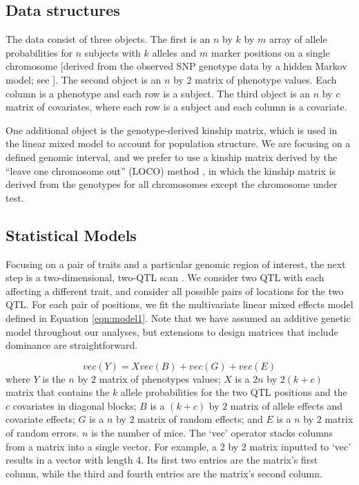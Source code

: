 \documentclass[oneside]{book}
\begin{document}
\subsection{Data structures}

The data consist of three objects. The first is an $n$ by $k$ by $m$
array of allele probabilities for $n$ subjects with $k$ alleles and
$m$ marker positions on a single chromosome [derived from the observed
SNP genotype data by a hidden Markov model; see
\citet{broman2019rqtl2}]. The second object is an $n$ by 2 matrix of
phenotype values. Each column is a phenotype and each row is a
subject. The third object is an $n$ by $c$ matrix of covariates, where
each row is a subject and each column is a covariate.

One additional object is the genotype-derived kinship matrix, which is
used in the linear mixed model to account for population structure. We
are focusing on a defined genomic interval, and we prefer to use a
kinship matrix derived by the ``leave one chromosome out'' (LOCO)
method \citep{yang2014advantages}, in which the kinship matrix is
derived from the genotypes for all chromosomes except the chromosome
under test.




\subsection{Statistical Models}

Focusing on a pair of traits and a particular genomic region of
interest, the next step is a two-dimensional, two-QTL
scan \citep{jiang1995multiple}. We consider two QTL with each
affecting a different trait, and consider all possible pairs of
locations for the two QTL. For each pair of positions, we fit
the multivariate linear mixed effects model defined in Equation
\ref{eqn:model1}. Note that we have
assumed an additive genetic model throughout our analyses, but
extensions to design matrices that include dominance are
straightforward.


\begin{equation}
vec(Y) = X vec(B) + vec(G) + vec(E)
\label{eqn:model1}
\end{equation}
where $Y$ is the $n$ by $2$ matrix of phenotypes values;
$X$ is a $2n$ by $2(k + c)$
matrix that contains the $k$ allele probabilities for the two QTL
positions and the $c$
covariates in diagonal blocks; $B$ is a $(k + c)$ by $2$ matrix of
allele effects and covariate effects; $G$ is a $n$ by $2$ matrix of
random effects; and $E$ is a $n$ by $2$ matrix of random errors. $n$
is the number of mice. The `vec' operator stacks columns from a matrix
into a single vector. For example, a 2 by 2 matrix inputted to `vec'
results in a vector with length 4. Its first two entries are the
matrix's first column, while the third and fourth entries are the
matrix's second column.
\end{document}
